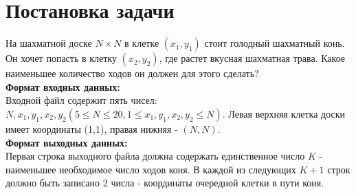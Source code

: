 \section{Постановка задачи}
\par
На шахматной доске $N\times{N}$ в клетке $(x_1,y_1)$ стоит голодный шахматный конь. Он
хочет попасть в клетку $(x_2,y_2)$, где растет вкусная шахматная трава. Какое
наименьшее количество ходов он должен для этого сделать?\\
{\bf Формат входных данных:}\\
Входной файл содержит пять чисел: $N, x_1, y_1, x_2, y_2 (5 \le N \le 20, 1
\le x_1,y_1,x_2,y_2 \le N)$. Левая верхняя клетка доски имеет координаты (1,1), правая
нижняя - $(N,N)$. \\
{\bf Формат выходных данных:}\\
Первая строка выходного файла должна содержать единственное число $K$ -
наименьшее необходимое число ходов коня. В каждой из следующих $K+1$ строк
должно быть записано 2 числа - координаты очередной клетки в пути коня.
\pagebreak

